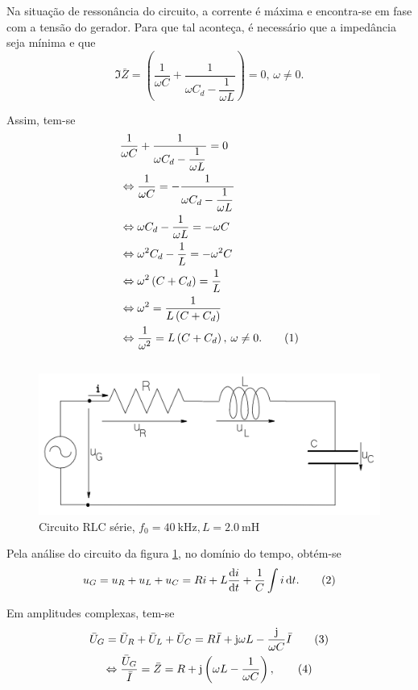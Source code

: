 \documentclass[a4paper, titlepage, portuguese]{article}
\newcommand{\eq}{\Leftrightarrow} %
\newcommand\numberthis{\addtocounter{equation}{1}\tag{\theequation}}
\begin{document}
		\par
		Na situação de ressonância do circuito, a corrente é máxima e encontra-se em fase com a tensão do gerador. Para que tal aconteça, é necessário que a impedância seja mínima e que
		\begin{equation}
			\Im{\bar{Z}} = \left(\dfrac{1}{\omega C} + \dfrac{1}{\omega C_d - \dfrac{1}{\omega L}}\right) = 0, \hspace{2pt}\omega \neq 0.
		\end{equation}

		\newpage
		Assim, tem-se
		\begin{align*}
			&\dfrac{1}{\omega C} + \dfrac{1}{\omega C_d - \dfrac{1}{\omega L}} = 0 \\
			&\Leftrightarrow \dfrac{1}{\omega C} = - \dfrac{1}{\omega C_d - \dfrac{1}{\omega L}} \\
			&\Leftrightarrow \omega C_d - \dfrac{1}{\omega L} = -\omega C \\
			&\Leftrightarrow \omega^2 C_d - \dfrac{1}{L} = -\omega^2 C \\
			&\Leftrightarrow \omega^2 \left(C + C_d \right) = \dfrac{1}{L} \\
			&\Leftrightarrow \omega^2 = \dfrac{1}{L\left(C + C_d \right)} \\
			&\Leftrightarrow \dfrac{1}{\omega^2} = L\left(C + C_d \right), \hspace{2pt}\omega \neq 0. \numberthis
		\end{align*}

	\subsection{}
		\begin{figure}[h]
			\centering
			\includegraphics[width=0.6\linewidth]{circuito1.png}
			\caption{Circuito RLC série, $f_0 = \SI{40}{\kilo\hertz}, L = \SI{2,0}{\milli\henry}$ }
			\label{fig:circuito1}
		\end{figure}
		\par
		Pela análise do circuito da figura \ref{fig:circuito1}, no domínio do tempo, obtém-se
		\begin{equation*}
			u_G = u_R + u_L + u_C = Ri + L\dv{i}{t} + \dfrac{1}{C} \int{i\dd{t}}. \numberthis
		\end{equation*}
		\par
		Em amplitudes complexas, tem-se
		\begin{gather*}
			\bar{U}_G = \bar{U}_R + \bar{U}_L + \bar{U}_C = R\bar{I} + \mathrm{j} \omega L - \dfrac{\mathrm{j}}{\omega C}\bar{I} \numberthis \\
			\eq \dfrac{\bar{U}_G}{\bar{I}} = \bar{Z} = R + \mathrm{j}\left(\omega L - \dfrac{1}{\omega C}\right), \numberthis
		\end{gather*}
\end{document}
